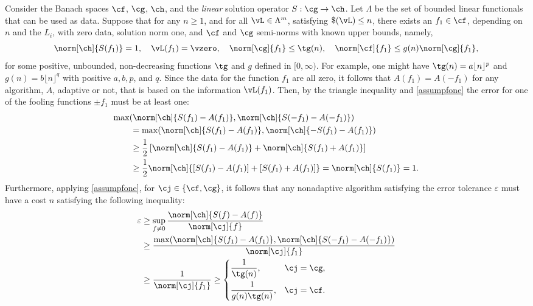 \documentclass[]{elsarticle}
\theoremstyle{definition}
\theoremstyle{remark}
\begin{document}
Consider the Banach spaces $\cf$, $\cg$, $\ch$, and the \emph{linear} solution operator $S: \cg \to \ch$.  Let $\Lambda$ be the set of bounded linear functionals that can be used as data. Suppose that for any $n\ge 1$, and for all $\vL \in \Lambda^m$, satisfying $\$(\vL)\le n$, there exists an $f_1 \in \cf$, depending on $n$ and the $L_i$, with zero data, solution norm one, and $\cf$ and $\cg$ semi-norms with known upper bounds, namely,
\begin{equation} \label{assumpfone}
\norm[\ch]{S(f_1)} = 1, \quad \vL(f_1)= \vzero, \quad
\norm[\cg]{f_1} \le \tg(n), \quad \norm[\cf]{f_1} \le g(n) \norm[\cg]{f_1}, 
\end{equation}
for some positive, unbounded, non-decreasing functions $\tg$ and $g$ defined in $[0,\infty)$.  For example, one might have $\tg(n)=a\lfloor n \rfloor^p$ and $g(n)=b\lfloor n \rfloor^q$ with positive $a, b, p$, and $q$.  Since the data for the function $f_1$ are all zero, it follows that $A(f_1)=A(-f_1)$ for any algorithm, $A$, adaptive or not, that is based on the information $\vL(f_1)$.  Then, by the triangle inequality and \eqref{assumpfone} the error for one of the fooling functions $\pm f_1$ must be at least one:
\begin{align*}
\MoveEqLeft{\max(\norm[\ch]{S(f_1)-A(f_1)},\norm[\ch]{S(-f_1)-A(-f_1)})} \\
& = \max(\norm[\ch]{S(f_1)-A(f_1)},\norm[\ch]{-S(f_1)-A(f_1)})\\
& \ge \frac{1}{2} \left[ \norm[\ch]{S(f_1)-A(f_1)}+ \norm[\ch]{S(f_1)+A(f_1)} \right] \\
& \ge \frac{1}{2} \norm[\ch]{[S(f_1)-A(f_1)]+[S(f_1)+A(f_1)]} = \norm[\ch]{S(f_1)}=1.
\end{align*}
Furthermore, applying \eqref{assumpfone}, for $\cj \in \{\cf,\cg\}$, it follows that any nonadaptive algorithm satisfying the error tolerance $\varepsilon$ must have a cost $n$ satisfying the following inequality:
\begin{align*}
\varepsilon & \ge \sup_{f \ne 0} \frac{\norm[\ch]{S(f)-A(f)}}{\norm[\cj]{f}} \\
& \ge \frac{\max(\norm[\ch]{S(f_1)-A(f_1)},\norm[\ch]{S(-f_1)-A(-f_1)})}{\norm[\cj]{f_1}} \\
& \ge \frac{1}{\norm[\cj]{f_1}} 
\ge \begin{cases} \displaystyle \frac{1}{\tg(n)}, & \cj=\cg,\\[2ex]
 \displaystyle  \frac{1}{g(n)\tg(n)}, & \cj=\cf.
\end{cases}
\end{align*}
\end{document}
